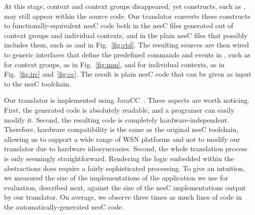 At this stage, context and context groups disappeared, yet \conesc
constructs, such as , may still appear within the
source code. Our translator converts these constructs to
functionally-equivalent nesC code both in the nesC files generated out
of context groups and individual contexts, and in the plain nesC files
that possibly includes them, such as  and  in
Fig.~\ref{fig:ctd}. The resulting sources are then wired to generic
interfaces that define the predefined commands and events in \conesc,
such as  for context groups, as in
Fig.~\ref{fig:mm}, and  for individual
contexts, as in Fig.~\ref{fig:irc} and~\ref{fig:cc}. The result is
plain nesC code that can be given as input to the nesC toolchain.




Our translator is implemented using JavaCC~\cite{javacc}. Three aspects
are worth noticing. First, the generated code is absolutely readable, and a programer can easily modify it. Second, the resulting code is completely
hardware-independent. Therefore, hardware compatibility is the same as
the original nesC toolchain, allowing us to support a wide range of
WSN platforms and not to modify our translator due to hardware
idiosyncrasies. Second, the whole translation process is only
seemingly straightforward. Rendering the logic embedded within the
\conesc abstractions does require a fairly sophisticated
processing. To give an intuition, we measured the size of the \conesc
implementations of the application we use for evaluation, described
next, against the size of the nesC implementations output by our
translator. On average, we observe three times as much lines of code
in the automatically-generated nesC code.


